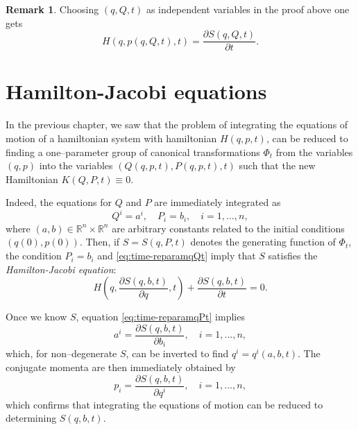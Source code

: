 \documentclass[english,fontsize=11pt,paper=b5]{scrbook}
\theoremstyle{definition}
\newtheorem{remark}{Remark}[chapter]
\begin{document}
    \begin{remark}\label{rmk:genfnhamflowct}
      Choosing $(q,Q,t)$ as independent variables in the proof above one gets
      \begin{equation}
        H(q, p(q,Q,t), t) = \frac{\partial S(q,Q,t)}{\partial t}.
      \end{equation}
    \end{remark}

    \section{Hamilton-Jacobi equations}

    In the previous chapter, we saw that the problem of integrating the equations of motion of a hamiltonian system with hamiltonian $H(q,p,t)$, can be reduced to finding a one--parameter group of canonical transformations $\Phi_t$ from the variables $(q,p)$ into the variables $(Q(q,p,t), P(q,p,t), t)$ such that the new Hamiltonian $K(Q,P,t) \equiv 0$.

    Indeed, the equations for $Q$ and $P$ are immediately integrated as
    \begin{equation}
      Q^i = a^i, \quad
      P_i = b_i, \quad
      i = 1,\ldots,n,
    \end{equation}
    where $(a,b)\in\mathbb{R}^{n}\times\mathbb{R}^n$ are arbitrary constants related to the initial conditions $(q(0), p(0))$.
    Then, if $S = S(q,P,t)$ denotes the generating function of $\Phi_t$, the condition $P_i=b_i$ and \eqref{eq:time-reparamqQt} imply that $S$ satisfies the \emph{Hamilton-Jacobi equation}:
    \begin{equation}\label{eq:Hamilton-Jacobi}
      H\left(q, \frac{\partial S(q,b,t)}{\partial q}, t\right) + \frac{\partial S(q,b,t)}{\partial t} = 0.
    \end{equation}

    Once we know $S$, equation \eqref{eq:time-reparamqPt} implies
    \begin{equation}
      a^i = \frac{\partial S(q,b,t)}{\partial b_i}, \quad i =1,\ldots,n,
    \end{equation}
    which, for non--degenerate $S$, can be inverted to find $q^i = q^i(a,b,t)$.
    The conjugate momenta are then immediately obtained by
    \begin{equation}
      p_i = \frac{\partial S(q,b,t)}{\partial q^i}, \quad i =1,\ldots,n,
    \end{equation}
    which confirms that integrating the equations of motion can be reduced to determining $S(q,b,t)$.
\end{document}
